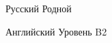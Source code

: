 
\begin{cvskills}

  \cvskill
    {Русский} %
    {Родной} %

  \cvskill
    {Английский} %
    {Уровень B2} %
    
\end{cvskills}
